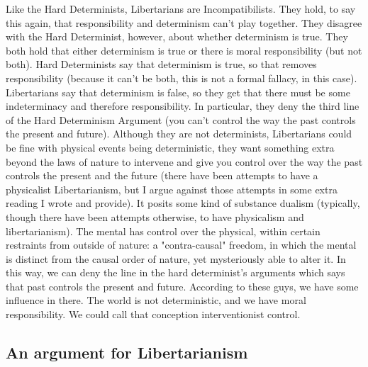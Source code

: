Like the Hard Determinists, Libertarians are Incompatibilists. They hold, to say this again, that responsibility and determinism can't play together. They disagree with the Hard Determinist, however, about whether determinism is true. They both hold that either determinism is true or there is moral responsibility (but not both). Hard Determinists say that determinism is true, so that removes responsibility (because it can't be both, this is not a formal fallacy, in this case). Libertarians say that determinism is false, so they get that there must be some indeterminacy and therefore responsibility. In particular, they deny the third line of the Hard Determinism Argument (you can't control the way the past controls the present and future). Although they are not determinists, Libertarians could be fine with physical events being deterministic, they want something extra beyond the laws of nature to intervene and give you control over the way the past controls the present and the future (there have been attempts to have a physicalist Libertarianism, but I argue against those attempts in some extra reading I wrote and provide). It posits some kind of substance dualism (typically, though there have been attempts otherwise, to have physicalism and libertarianism). The mental has control over the physical, within certain restraints from outside of nature: a "contra-causal" freedom, in which the mental is distinct from the causal order of nature, yet mysteriously able to alter it. In this way, we can deny the line in the hard determinist’s arguments which says that past controls the present and future. According to these guys, we have some influence in there. The world is not deterministic, and we have moral responsibility. We could call that conception interventionist control. 

\subsection{An argument for Libertarianism}

